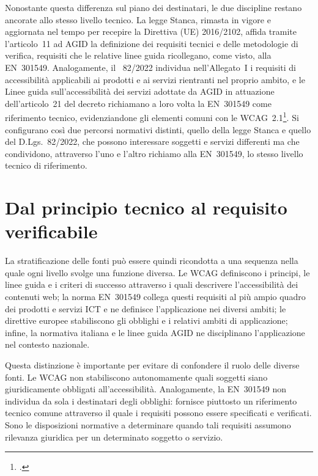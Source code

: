 Nonostante questa differenza sul piano dei destinatari, le due discipline restano ancorate allo stesso livello tecnico. La legge Stanca, rimasta in vigore e aggiornata nel tempo per recepire la Direttiva (UE) 2016/2102, affida tramite l'articolo~11 ad AGID la definizione dei requisiti tecnici e delle metodologie di verifica, requisiti che le relative linee guida ricollegano, come visto, alla EN~301549. Analogamente, il ~82/2022 individua nell'Allegato~I i requisiti di accessibilità applicabili ai prodotti e ai servizi rientranti nel proprio ambito, e le Linee guida sull'accessibilità dei servizi adottate da AGID in attuazione dell'articolo~21 del decreto richiamano a loro volta la EN~301549 come riferimento tecnico, evidenziandone gli elementi comuni con le WCAG~2.1\footcite[§~8.5]{agid:lg-82-2022}. Si configurano così due percorsi normativi distinti, quello della legge Stanca e quello del D.Lgs.~82/2022, che possono interessare soggetti e servizi differenti ma che condividono, attraverso l'uno e l'altro richiamo alla EN~301549, lo stesso livello tecnico di riferimento.

\section{Dal principio tecnico al requisito verificabile}

La stratificazione delle fonti può essere quindi ricondotta a una sequenza nella quale ogni livello svolge una funzione diversa. Le WCAG definiscono i principi, le linee guida e i criteri di successo attraverso i quali descrivere l'accessibilità dei contenuti web; la norma EN~301549 collega questi requisiti al più ampio quadro dei prodotti e servizi ICT e ne definisce l'applicazione nei diversi ambiti; le direttive europee stabiliscono gli obblighi e i relativi ambiti di applicazione; infine, la normativa italiana e le linee guida AGID ne disciplinano l'applicazione nel contesto nazionale.

Questa distinzione è importante per evitare di confondere il ruolo delle diverse fonti. Le WCAG non stabiliscono autonomamente quali soggetti siano giuridicamente obbligati all'accessibilità. Analogamente, la EN~301549 non individua da sola i destinatari degli obblighi: fornisce piuttosto un riferimento tecnico comune attraverso il quale i requisiti possono essere specificati e verificati. Sono le disposizioni normative a determinare quando tali requisiti assumono rilevanza giuridica per un determinato soggetto o servizio.


